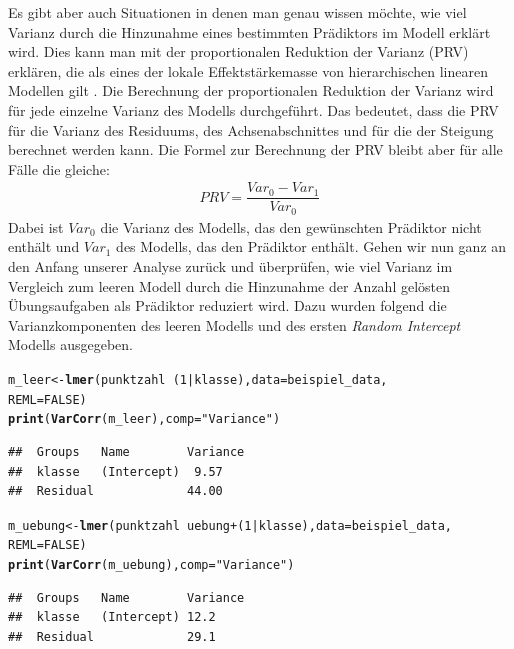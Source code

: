 \documentclass[12pt]{article}\usepackage[]{graphicx}\usepackage[]{color}
\makeatletter
\newcommand{\hlnum}[1]{\textcolor[rgb]{0.686,0.059,0.569}{#1}}%
\newcommand{\hlstr}[1]{\textcolor[rgb]{0.192,0.494,0.8}{#1}}%
\newcommand{\hlopt}[1]{\textcolor[rgb]{0,0,0}{#1}}%
\newcommand{\hlstd}[1]{\textcolor[rgb]{0.345,0.345,0.345}{#1}}%
\newcommand{\hlkwb}[1]{\textcolor[rgb]{0.69,0.353,0.396}{#1}}%
\newcommand{\hlkwc}[1]{\textcolor[rgb]{0.333,0.667,0.333}{#1}}%
\newcommand{\hlkwd}[1]{\textcolor[rgb]{0.737,0.353,0.396}{\textbf{#1}}}%
\newenvironment{kframe}{%
 \def\at@end@of@kframe{}%
 \ifinner\ifhmode%
  \def\at@end@of@kframe{\end{minipage}}%
  \begin{minipage}{\columnwidth}%
 \fi\fi%
 \def\FrameCommand##1{\hskip\@totalleftmargin \hskip-\fboxsep
 \colorbox{shadecolor}{##1}\hskip-\fboxsep
     \hskip-\linewidth \hskip-\@totalleftmargin \hskip\columnwidth}%
 \MakeFramed {\advance\hsize-\width
   \@totalleftmargin\z@ \linewidth\hsize
   \@setminipage}}%
 {\par\unskip\endMakeFramed%
 \at@end@of@kframe}
\newenvironment{knitrout}{}{} %
\makeatother
\begin{document}
Es gibt aber auch Situationen in denen man genau wissen möchte, wie viel Varianz durch die Hinzunahme eines bestimmten Prädiktors im Modell erklärt wird. Dies kann man mit der proportionalen Reduktion der Varianz (PRV) erklären, die als eines der lokale Effektstärkemasse von hierarchischen linearen Modellen gilt \citep{PEUGH201085, woltman2012introduction}. Die Berechnung der proportionalen Reduktion der Varianz wird für jede einzelne Varianz des Modells durchgeführt. Das bedeutet, dass die PRV für die Varianz des Residuums, des Achsenabschnittes und für die der Steigung berechnet werden kann. Die Formel zur Berechnung der PRV bleibt aber für alle Fälle die gleiche:
\begin{equation} \label{eq:prv}
\begin{split}	
 PRV = \dfrac{Var_{0} - Var_{1}}{Var_{0}}
\end{split}	
\end{equation}
Dabei ist $Var_{0}$ die Varianz des Modells, das den gewünschten Prädiktor nicht enthält und $Var_{1}$ des Modells, das den Prädiktor enthält. Gehen wir nun ganz an den Anfang unserer Analyse zurück und überprüfen, wie viel Varianz im Vergleich zum leeren Modell durch die Hinzunahme der Anzahl gelösten Übungsaufgaben als Prädiktor reduziert wird. Dazu wurden folgend die Varianzkomponenten des leeren Modells und des ersten \textit{Random Intercept} Modells ausgegeben. 

\singlespacing
\begin{knitrout}
\color{fgcolor}\begin{kframe}
\begin{alltt}
\hlstd{m_leer} \hlkwb{<-} \hlkwd{lmer}\hlstd{(punktzahl} \hlopt{~} \hlstd{(}\hlnum{1} \hlopt{|} \hlstd{klasse),} \hlkwc{data} \hlstd{= beispiel_data,}
    \hlkwc{REML} \hlstd{=} \hlnum{FALSE}\hlstd{)}
\hlkwd{print}\hlstd{(}\hlkwd{VarCorr}\hlstd{(m_leer),} \hlkwc{comp} \hlstd{=} \hlstr{"Variance"}\hlstd{)}
\end{alltt}
\begin{verbatim}
##  Groups   Name        Variance
##  klasse   (Intercept)  9.57   
##  Residual             44.00
\end{verbatim}
\begin{alltt}
\hlstd{m_uebung} \hlkwb{<-} \hlkwd{lmer}\hlstd{(punktzahl} \hlopt{~} \hlstd{uebung} \hlopt{+} \hlstd{(}\hlnum{1} \hlopt{|} \hlstd{klasse),} \hlkwc{data} \hlstd{= beispiel_data,}
    \hlkwc{REML} \hlstd{=} \hlnum{FALSE}\hlstd{)}
\hlkwd{print}\hlstd{(}\hlkwd{VarCorr}\hlstd{(m_uebung),} \hlkwc{comp} \hlstd{=} \hlstr{"Variance"}\hlstd{)}
\end{alltt}
\begin{verbatim}
##  Groups   Name        Variance
##  klasse   (Intercept) 12.2    
##  Residual             29.1
\end{verbatim}
\end{kframe}
\end{knitrout}
\end{document}
